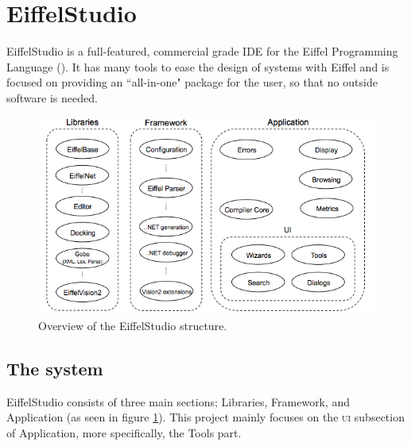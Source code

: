 \section{EiffelStudio}
EiffelStudio is a full-featured, commercial grade IDE for the Eiffel Programming Language (\cite[Quote from Origo website]{eiffel2006}). It has many tools to ease the design of systems with Eiffel and is focused on providing an ``all-in-one" package for the user, so that no outside software is needed.

\begin{figure}[h]
\centerline{
\includegraphics[scale=0.7]{images/eiffelstudio-structure-full.png}
}
\caption[Overview of the EiffelStudio structure]{Overview of the EiffelStudio structure.}
\label{fig:eiffelstudio_structure}
\end{figure}


\subsection{The system}
EiffelStudio consists of three main sections; Libraries, Framework, and Application (as seen in figure \ref{fig:eiffelstudio_structure}). This project mainly focuses on the \textsc{ui} subsection of Application, more specifically, the Tools part.

